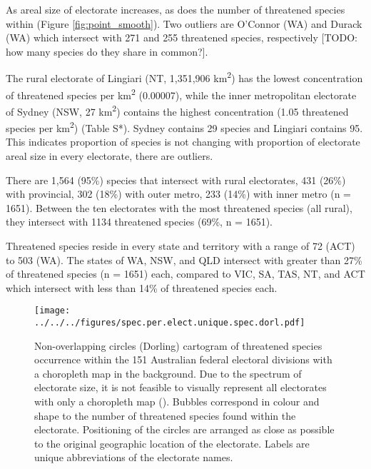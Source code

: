 \documentclass[a4paper,11pt]{article}
\begin{document}
As areal size of electorate increases, as does the number of threatened species within (Figure \ref{fig:point_smooth}). Two outliers are O'Connor (WA) and Durack (WA) which intersect with 271 and 255 threatened species, respectively [TODO: how many species do they share in common?].

The rural electorate of Lingiari (NT, 1,351,906 km\textsuperscript{2}) has the lowest concentration of threatened species per km\textsuperscript{2} (0.00007), while the inner metropolitan electorate of Sydney (NSW, 27 km\textsuperscript{2}) contains the highest concentration (1.05 threatened species per km\textsuperscript{2}) (Table S*). Sydney contains 29 species and Lingiari contains 95. This indicates proportion of species is not changing with proportion of electorate areal size in every electorate, there are outliers.

There are 1,564 (95\%) species that intersect with rural electorates, 431 (26\%) with provincial, 302 (18\%) with outer metro, 233 (14\%) with inner metro (n = 1651). Between the ten electorates with the most threatened species (all rural), they intersect with 1134 threatened species (69\%, n = 1651).

Threatened species reside in every state and territory with a range of 72 (ACT) to 503 (WA). The states of WA, NSW, and QLD intersect with greater than 27\% of threatened species (n = 1651) each, compared to VIC, SA, TAS, NT, and ACT which intersect with less than 14\% of threatened species each.


\begin{figure}[H]
	\centering
    \texttt{[image: ../../../figures/spec.per.elect.unique.spec.dorl.pdf]}
    \caption{Non-overlapping circles (Dorling) cartogram of threatened species occurrence within the 151 Australian federal electoral divisions with a choropleth map in the background. Due to the spectrum of electorate size, it is not feasible to visually represent all electorates with only a choropleth map (\cite{tomasettiMappingAustraliaElectorates2021}). Bubbles correspond in colour and shape to the number of threatened species found within the electorate. Positioning of the circles are arranged as close as possible to the original geographic location of the electorate. Labels are unique abbreviations of the electorate names.}
    \label{fig:dorl}
\end{figure}

\end{document}
